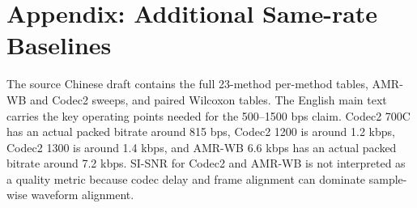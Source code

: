 \documentclass[10pt,twocolumn]{article}
\begin{document}
\section{Appendix: Additional Same-rate Baselines}

The source Chinese draft contains the full 23-method per-method tables, AMR-WB and Codec2 sweeps, and paired Wilcoxon tables. The English main text carries the key operating points needed for the 500--1500 bps claim. Codec2 700C has an actual packed bitrate around 815 bps, Codec2 1200 is around 1.2 kbps, Codec2 1300 is around 1.4 kbps, and AMR-WB 6.6 kbps has an actual packed bitrate around 7.2 kbps. SI-SNR for Codec2 and AMR-WB is not interpreted as a quality metric because codec delay and frame alignment can dominate sample-wise waveform alignment.
\end{document}
